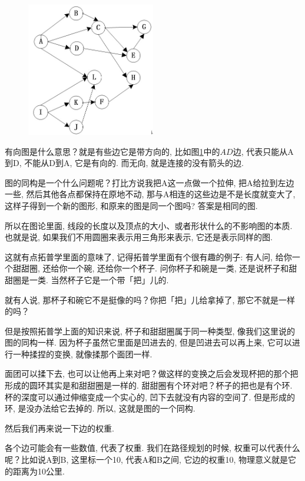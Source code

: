 \begin{figure}[ht]
  \centering
  \includegraphics[width=0.5\textwidth]{asset/ee6e89d4-03e6-450b-b886-2583b91664ab.png}
  \caption{}
  \label{fig:img6_5}
\end{figure}

有向图是什么意思？就是有些边它是带方向的, 比如图\ref{fig:img6_5}中的$AD$边, 代表只能从A到D, 不能从D到A, 它是有向的. 而无向, 就是连接的没有箭头的边. 

图的同构是一个什么问题呢？打比方说我把A这一点做一个拉伸, 把A给拉到左边一些, 然后其他各点都保持在原地不动, 那与A相连的这些边是不是长度就变大了, 这样子得到一个新的图形, 和原来的图是同一个图吗? 答案是相同的图. 

所以在图论里面, 线段的长度以及顶点的大小、或者形状什么的不影响图的本质. 也就是说, 如果我们不用圆圈来表示用三角形来表示, 它还是表示同样的图. 

这就有点拓普学里面的意味了, 记得拓普学里面有个很有趣的例子: 有人问, 给你一个甜甜圈, 还给你一个碗, 还给你一个杯子. 问你杯子和碗是一类, 还是说杯子和甜甜圈是一类. 当然杯子它是一个带「把」儿的. 

就有人说, 那杯子和碗它不是挺像的吗？你把「把」儿给拿掉了, 那它不就是一样的吗？

但是按照拓普学上面的知识来说, 杯子和甜甜圈属于同一种类型, 像我们这里说的图的同构一样. 因为杯子虽然它里面是凹进去的, 但是凹进去可以再上来, 它可以进行一种揉捏的变换, 就像揉那个面团一样. 

面团可以揉下去, 也可以让他再上来对吧？做这样的变换之后会发现杯把的那个把形成的圆环其实是和甜甜圈是一样的. 甜甜圈有个环对吧？杯子的把也是有个环. 杯的深度可以通过伸缩变成一个实心的, 凹下去就没有内容的空间了. 但是形成的环, 是没办法给它去掉的. 所以, 这就是图的一个同构. 

然后我们再来说一下边的权重. 

各个边可能会有一些数值, 代表了权重. 我们在路径规划的时候, 权重可以代表什么呢？比如说A到B, 这里标一个10, 代表A和B之间, 它边的权重10, 物理意义就是它的距离为10公里. 

